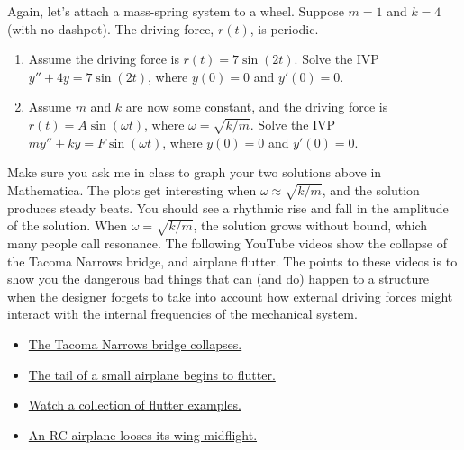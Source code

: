 \begin{problem}
%
Again, let's attach a mass-spring system to a wheel. Suppose $m=1$ and $k=4$ (with no dashpot). 
The driving force, $r(t)$, is periodic. 
\begin{enumerate}
 \item Assume the driving force is $r(t) =7 \sin(2t)$. Solve the IVP $y''+4y=7\sin(2t)$, where $y(0)=0$ and $y'(0)=0$. 
 \item Assume $m$ and $k$ are now some constant, and the driving force is $r(t) = A\sin(\omega t)$, where $\omega = \sqrt{k/m}$. Solve the IVP $my''+ky=F\sin(\omega t)$, where $y(0)=0$ and $y'(0)=0$.
\end{enumerate}
\end{problem}

Make sure you ask me in class to graph your two solutions above in Mathematica. The plots get interesting when $\omega\approx \sqrt{k/m}$, and the solution produces steady beats. You should see a rhythmic rise and fall in the amplitude of the solution.  When $\omega =  \sqrt{k/m}$, the solution grows without bound, which many people call resonance. The following YouTube videos show the collapse of the Tacoma Narrows bridge, and airplane flutter. The points to these videos is to show you the dangerous bad things that can (and do) happen to a structure when the designer forgets to take into account how external driving forces might interact with the internal frequencies of the mechanical system.
\begin{itemize}
 \item \href{http://www.youtube.com/watch?v=xox9BVSu7Ok}{The Tacoma Narrows bridge collapses.}
 \item \href{http://www.youtube.com/watch?v=iTFZNrTYp3k}{The tail of a small airplane begins to flutter.}
 \item \href{http://www.youtube.com/watch?v=OhwLojNerMU}{Watch a collection of flutter examples.}
 \item \href{http://www.youtube.com/watch?v=lczhD2nUedY}{An RC airplane looses its wing midflight.}
\end{itemize}

